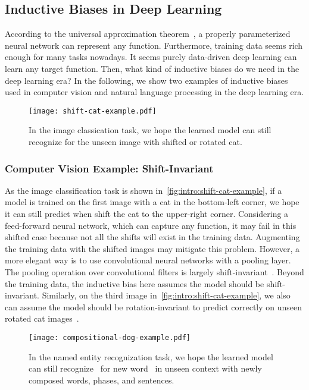 \subsection{Inductive Biases in Deep Learning}
\label{ssec:intro:bias-source}
According to the universal approximation
theorem~\citep{hornik1989multilayer}, a properly parameterized neural
network can represent any function. Furthermore, training data seems
rich enough for many tasks nowadays. It seems purely data-driven deep
learning can learn any target function. Then, what kind of inductive
biases do we need in the deep learning era? In the following, we show two
examples of inductive biases used in computer vision and natural
language processing in the deep learning era.
\begin{figure}[!tbp]
  \begin{center}
  \texttt{[image: shift-cat-example.pdf]}
  \end{center}
  \caption{\label{fig:intro:shift-cat-example}In the image classication
    task, we hope the learned model can still recognize  for the
    unseen image with shifted or rotated cat.}
\end{figure}

\subsubsection{Computer Vision Example: Shift-Invariant}
\label{sssec:intro:cv-example}

As the image classification task is shown
in~\autoref{fig:intro:shift-cat-example}, if a model is trained on the
first image with a cat in the bottom-left corner, we hope it can still
predict  when shift the cat to the upper-right corner.
Considering a feed-forward neural network, which can capture any
function, it may fail in this shifted case because not all the shifts
will exist in the training data. Augmenting the training data with the
shifted images may mitigate this problem. However, a more elegant way
is to use convolutional neural networks with a pooling layer. The
pooling operation over convolutional filters is largely
shift-invariant~\citep{zhang2019making}. Beyond the training data, the
inductive bias here assumes the model should be shift-invariant.
Similarly, on the third image
in~\autoref{fig:intro:shift-cat-example}, we also can assume the model
should be rotation-invariant to predict correctly on unseen rotated
cat images~\citep{cheng2016rifd}.

\begin{figure}[!tbp]
  \begin{center}
  \texttt{[image: compositional-dog-example.pdf]}
  \end{center}
  \caption{\label{fig:intro:compositional-dog-example}In the named entity
    recognization task, we hope the learned model can still recognize
    ~for new word~ in unseen context with newly composed
    words, phases, and sentences.}
\end{figure}

